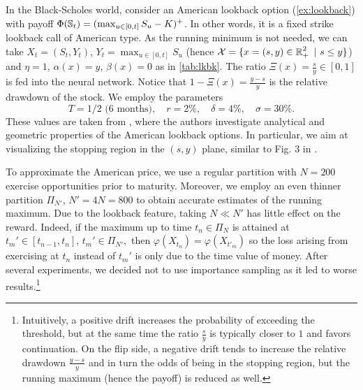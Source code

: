In the Black-Scholes world, consider an  American lookback option (\cref{ex:lookback}) with payoff $\Phi(\operatorname{\mathbb{S}}_t) = (\max_{u\in[0,t]} S_u - K)^+$. In other words, it is a fixed strike lookback call of American type.  %
 As the running minimum is not needed, we can take $X_t = (S_t,Y_t)$, $Y_t = \max_{u\in[0,t]} S_u$ (hence $\operatorname{\mathcal{X}} = \{x=(s,y) \in \operatorname{\mathbb{R}}_+^2 \ | \ s \le y\}$) and $\eta=1$, $\alpha(x) = y$, $\beta(x) = 0$ as in \cref{tab:lkbk}.    The ratio $\Xi(x) = \frac{s}{y}\in [0,1]$  is fed into the neural network. Notice that $1-\Xi(x) = \frac{y-s}{y}$ is the relative drawdown of the stock. 
We employ the parameters 
$$ T=1/2 \text{ ($6$ months)}, \quad  r=2\%, \quad \delta =4\%, \quad  \sigma = 30 \%.$$ 
These values are taken from  \citet{DaiKwok}, where the authors investigate analytical and geometric properties of the American lookback options. In particular, we aim at visualizing the stopping region in the $(s,y)$ plane, similar to Fig. $3$ in \cite{DaiKwok}.   %

To approximate the American price, we use a regular partition  with $N=200$ exercise opportunities prior to maturity. %
Moreover, we employ an even thinner  partition $\Pi_{N'}$, $N'=4 N = 800$ to obtain accurate estimates of  the running maximum. Due to the lookback feature,  taking $N \ll N'$ has little effect on the reward. Indeed, if the maximum up to time $t_n\in \Pi_{N}$  is attained at $t_m' \in [t_{n-1},t_{n}]$,  $t_m'\in \Pi_{N'},$ then $\varphi(X_{t_n})=\varphi(X_{t'_m})$ so the loss arising from exercising at $t_n$ instead of $t_m'$ is only due to the time value of money. 
After several experiments, we decided not to use importance sampling as it led to worse results.\footnote{Intuitively, a positive drift  increases the probability of exceeding the threshold, but at the same time the ratio $\frac{s}{y}$ is typically closer to $1$ and  favors continuation. On the flip side, a negative drift tends to increase the relative drawdown $\frac{y-s}{y}$ and in turn the odds of being in the stopping region, but the running maximum (hence the payoff) is reduced as well.} %


